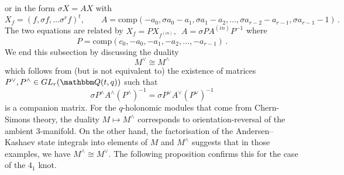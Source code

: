 \documentclass[12pt,reqno]{amsart}
\theoremstyle{definition}
\def\BQ{\mathbbm Q}
\def\s{\sigma}
\def\be{\begin{equation}}
\def\ee{\end{equation}}
\def\comp{\mathrm{comp}}
\begin{document}
\noindent
or in the form $\s X = A X$ with
{\small
$$
X_f=(f, \s f, \dots \s^r f)^t, \qquad 
A=\comp(- a_{0} , \s a_{0}- a_{1} , \s a_{1}- a_{2} , \dots ,
\s a_{r-2}- a_{r-1} , \s a_{r-1}-1) \,.
$$
}
The two equations are related by 
$X_f = P X_{f^{(in)}}, \,\,\, A=\s P A^{(in)} P^{-1}$
where
$$
P=\comp(c_{0} , - a_{0} , - a_{1} , - a_{2} , \dots , - a_{r-1}) \,.
$$
We end this subsection by discussing the duality
\be
M^{\vee} \cong M^{\wedge}
\ee
which follows from (but is not equivalent to) the existence of matrices
$P^{\vee},P^{\wedge} \in GL_r(\BQ(t,q))$ such that
\be
\s P^{\wedge} A^{\wedge} (P^{\wedge})^{-1}
=
\s P^{\vee} A^{\vee} (P^{\vee})^{-1}
\ee
is a companion matrix. For the $q$-holonomic modules that come from Chern-Simons
theory, the duality $M \mapsto M^{\wedge}$ corresponds to orientation-reversal of
the ambient 3-manifold. On the other hand, the factorisation of the Andersen--Kashaev
state integrals into elements of $M$ and $M^{\wedge}$ suggests that in those
examples, we have $M^{\wedge}\cong M^{\vee}$. The following proposition
confirms this for the case of the $4_1$ knot. 
\end{document}
